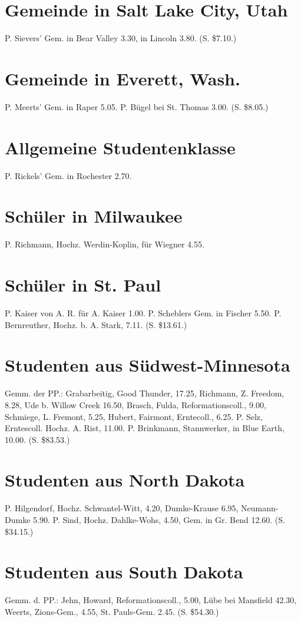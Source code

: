 \section{Gemeinde in Salt Lake City, Utah}
P. Sievers’ Gem. in Bear Valley 3.30, in Lincoln 3.80. (S. \$7.10.)

\section{Gemeinde in Everett, Wash.}
P. Meerts’ Gem. in Raper 5.05. P. Bügel bei St. Thomas 3.00. (S. \$8.05.)

\section{Allgemeine Studentenklasse}
P. Rickels’ Gem. in Rochester 2.70.

\section{Schüler in Milwaukee}
P. Richmann, Hochz. Werdin-Koplin, für Wiegner 4.55.

\section{Schüler in St. Paul}
P. Kaiser von A. R. für A. Kaiser 1.00. P. Scheblers Gem. in Fischer 5.50. P. Bernreuther, Hochz. b. A. Stark, 7.11. (S. \$13.61.)

\section{Studenten aus Südwest-Minnesota}
Gemm. der PP.: Grabarbeitig, Good Thunder, 17.25, Richmann, Z. Freedom, 8.28, Ude b. Willow Creek 16.50, Brasch, Fulda, Reformationscoll., 9.00, Schmiege, L. Fremont, 5.25, Hubert, Fairmont, Erntecoll., 6.25. P. Selz, Erntescoll. Hochz. A. Rist, 11.00. P. Brinkmann, Stannwerker, in Blue Earth, 10.00. (S. \$83.53.)

\section{Studenten aus North Dakota}
P. Hilgendorf, Hochz. Schwantel-Witt, 4.20, Dumke-Krause 6.95, Neumann-Dumke 5.90. P. Sind, Hochz. Dahlke-Wohs, 4.50, Gem. in Gr. Bend 12.60. (S. \$34.15.)

\section{Studenten aus South Dakota}
Gemm. d. PP.: Jehn, Howard, Reformationscoll., 5.00, Lübe bei Mansfield 42.30, Weerts, Zions-Gem., 4.55, St. Pauls-Gem. 2.45. (S. \$54.30.)


